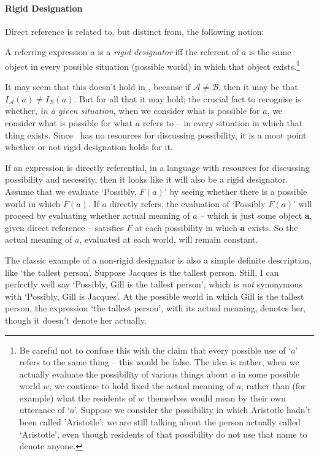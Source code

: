 \paragraph{Rigid Designation} Direct reference is related to, but distinct from, the following notion:
\begin{definition}
	A referring expression $a$ is a \emph{rigid designator} iff the referent of $a$ is the same object in every possible situation (possible world) in which that object exists.\footnote{Be careful not to confuse this with the claim that every possible use of ‘$a$’ refers to the same thing – this would be false. The idea is rather, when we actually evaluate the possibility of various things about $a$ in some possible world $w$, we continue to hold fixed the actual meaning of $a$, rather than (for example) what the residents of $w$ themselves would mean by their own utterance of ‘$a$’. Suppose we consider the possibility in which Aristotle hadn't been called ’Aristotle’: we are still talking about the person actually called ‘Aristotle’, even though residents of that possibility do not use that name to denote anyone.}
\end{definition}
It may seem that this doesn't hold in \ltwo, because if $\mathscr{A}\neq\mathscr{B}$, then it may be that  $I_{\mathscr{A}}(a)\neq I_{\mathscr{B}}(a)$. But for all that it may hold; the crucial fact to recognise is whether, \emph{in a given situation}, when we consider what is possible for $a$, we consider what is possible for what $a$ refers to – in every situation in which that thing exists. Since \ltwo\ has no resources for discussing possibility, it is a moot point whether or not rigid designation holds for it. 

If an expression is directly referential, in a language with resources for discussing possibility and necessity, then it looks like it will also be a rigid designator. Assume that we evaluate ‘Possibly, $F(a)$’ by seeing whether there is a possible world in which $F(a)$. If $a$ directly refers, the evaluation of ‘Possibly $F(a)$’ will proceed by evaluating whether actual meaning of $a$ – which is just some object $\mathbf{a}$, given direct reference – satisfies $F$ at each possibility in which $\mathbf{a}$ exists. So the actual meaning of $a$, evaluated at each world, will remain constant.

The classic example of a non-rigid designator is also a simple definite description, like ‘the tallest person’. Suppose Jacques is the tallest person. Still, I can perfectly well say ‘Possibly, Gill is the tallest person’, which is \emph{not} synonymous with ‘Possibly, Gill is Jacques’. At the possible world in which Gill is the tallest person, the expression ‘the tallest person’, with its actual meaning, denotes her, though it doesn't denote her actually. 

